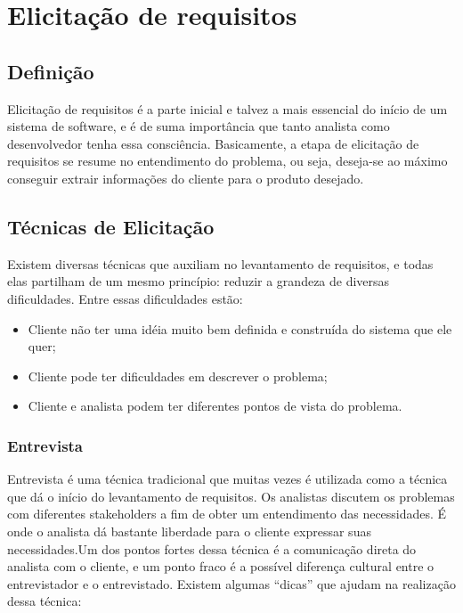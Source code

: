 \chapter{Elicitação de requisitos}

\section{Definição}

  Elicitação de requisitos é a parte inicial e talvez a mais essencial do início de um sistema de software, e é de suma importância que
  tanto analista como desenvolvedor tenha essa consciência. Basicamente, a etapa de elicitação de requisitos se resume no entendimento
  do problema, ou seja, deseja-se ao máximo conseguir extrair informações do cliente para o produto desejado.

  \section{Técnicas de Elicitação}

  Existem diversas técnicas que auxiliam no levantamento de requisitos, e todas elas partilham de um mesmo princípio: reduzir a
  grandeza de diversas dificuldades. Entre essas dificuldades estão:

  \begin{itemize}
    \item{Cliente não ter uma idéia muito bem definida e construída do sistema que ele quer;}
    \item{Cliente pode ter dificuldades em descrever o problema;}
    \item{Cliente e analista podem ter diferentes pontos de vista do problema.}
  \end{itemize}

\subsection{Entrevista}

  Entrevista é uma técnica tradicional que muitas vezes é utilizada como a técnica que dá o início do levantamento de requisitos.
  Os analistas discutem os problemas com diferentes stakeholders a fim de obter um entendimento das necessidades. É onde o analista
  dá bastante liberdade para o cliente expressar suas necessidades.Um dos pontos fortes dessa técnica é a comunicação direta do analista
  com o cliente, e um ponto fraco é a possível diferença cultural entre o entrevistador e o entrevistado. Existem algumas “dicas” que
  ajudam na realização dessa técnica:

